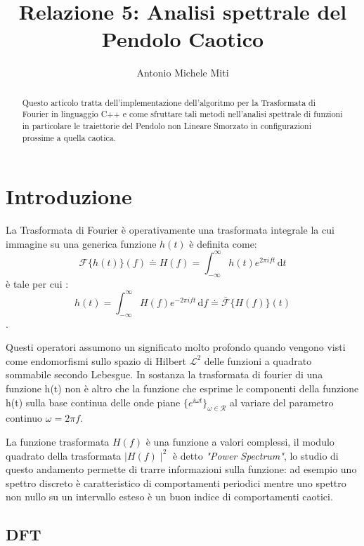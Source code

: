 \documentclass[13pt]{article}
\title{Relazione 5: Analisi spettrale del Pendolo Caotico}
\author{Antonio Michele Miti}
\begin{document}
\maketitle
\begin{abstract}
Questo articolo tratta dell'implementazione dell'algoritmo per la Trasformata di Fourier in linguaggio C++ e come sfruttare tali metodi nell'analisi spettrale di funzioni in particolare le traiettorie del Pendolo non Lineare Smorzato in configurazioni prossime a quella caotica.
\end{abstract}


\section{Introduzione}
La Trasformata di Fourier è operativamente una trasformata integrale la cui immagine su una generica funzione $h(t)$ è definita come:
	\begin{equation}
	\mathcal{F}\lbrace h(t) \rbrace (f) \doteq H(f) = \int_{-\infty}^{\infty} h(t) e^{2 \pi  i  f  t}\, \textrm{d} t
	\end{equation}
è tale per cui :
	\begin{equation}
	h(t) = \int_{-\infty}^{\infty} H(f) e^{-2 \pi  i  f  t}\, \textrm{d} f \doteq \bar{\mathcal{F}}\lbrace H(f) \rbrace (t)
	\end{equation}.

Questi operatori assumono un significato molto profondo quando vengono visti come endomorfismi sullo spazio di Hilbert $ \mathcal{L}^2$ delle funzioni a quadrato sommabile secondo Lebesgue.
In sostanza la trasformata di fourier di una funzione h(t) non è altro che la funzione che esprime le componenti della funzione h(t) sulla base continua delle onde piane $\lbrace e^{i \omega t} \rbrace_{\omega \in \mathcal{R}} $ al variare del parametro continuo $\omega = 2 \pi f$.

La funzione trasformata $H(f)$ è una funzione a valori complessi, il modulo quadrato della trasformata $\mid H(f) \mid ^{2}$ è detto \emph{"Power Spectrum"}, lo studio di questo andamento permette di trarre informazioni sulla funzione: ad esempio uno spettro discreto è caratteristico di comportamenti periodici mentre uno spettro non nullo su un intervallo esteso è un buon indice di comportamenti caotici.




\subsection{DFT}
\end{document}
